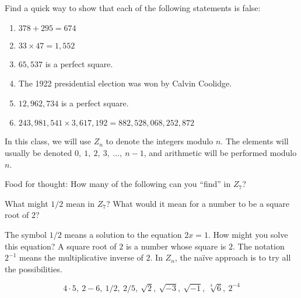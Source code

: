 \documentclass[space,nooutcomes]{ximera}
\begin{document}
\begin{problem}
Find a quick way to show that each of the following statements is false: 
\begin{enumerate}
\item $378 + 295 = 674$
\item $33 \times 47 = 1,552$
\item $65,537$ is a perfect square.
\item The 1922 presidential election was won by Calvin Coolidge.
\item $12,962,734$ is a perfect square.
\item $243,981,541 \times 3,617,192 = 882,528,068,252,872$
\end{enumerate}
\begin{freeResponse}
\end{freeResponse}
\end{problem}

In this class, we will use $Z_n$ to denote the integers modulo $n$.  The elements will usually be denoted $0,\ 1,\ 2,\ 3,\ \dots,\ n - 1$, and arithmetic will be performed modulo $n$.  

\begin{problem}
Food for thought:  How many of the following can you ``find'' in $Z_7$?  
\begin{hint}
What might $1/2$ mean in $Z_7$?  What would it mean for a number to be a square root of $2$?  
\end{hint}
\begin{hint}
The symbol $1/2$ means a solution to the equation $2x = 1$.  How might you solve this equation?  A square root of $2$ is a number whose square is $2$.  The notation $2^{-1}$ means the multiplicative inverse of $2$.  In $Z_n$, the na\"ive approach is to try all the possibilities.
\end{hint}
\[
4\cdot 5,\ 2 - 6,\ 1/2,\ 2/5,\ \sqrt{2},\ \sqrt{-3},\ \sqrt{-1},\ \sqrt[3]{6},\ 2^{-4}
\]
\begin{freeResponse}
\end{freeResponse}
\end{problem}
\end{document}
